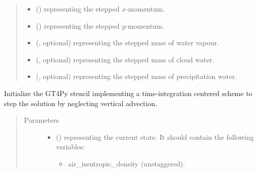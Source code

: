 \documentclass[letterpaper,10pt,english]{sphinxmanual}
\begin{document}
\begin{fulllineitems}
\begin{fulllineitems}
\begin{quote}
\begin{description}
\begin{itemize}
\item {} 
 () \textendash{}  representing the stepped \(x\)-momentum.

\item {} 
 () \textendash{}  representing the stepped \(y\)-momentum.

\item {} 
 (, optional) \textendash{}  representing the stepped mass of water vapour.

\item {} 
 (, optional) \textendash{}  representing the stepped mass of cloud water.

\item {} 
 (, optional) \textendash{}  representing the stepped mass of precipitation water.

\end{itemize}


\end{description}\end{quote}

\end{fulllineitems}


\begin{fulllineitems}
\label{\detokenize{api:tasmania.dycore.prognostic_isentropic_centered.PrognosticIsentropicCentered._stencil_stepping_by_neglecting_vertical_advection_initialize}}
Initialize the GT4Py stencil implementing a time-integration centered scheme to step the solution
by neglecting vertical advection.
\begin{quote}\begin{description}
\item[{Parameters}] \leavevmode\begin{itemize}
\item {} 
 () \textendash{} 
{\hyperref[\detokenize{api:tasmania.storages.state_isentropic.StateIsentropic}]{}} representing the current state.
It should contain the following variables:
\begin{itemize}
\item {} 
air\_isentropic\_density (unstaggered).


\end{itemize}
\end{itemize}
\end{description}
\end{quote}
\end{fulllineitems}
\end{fulllineitems}
\end{document}
